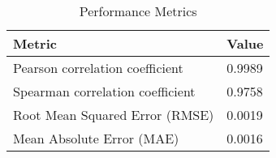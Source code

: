 \documentclass{article}
\begin{document}
\begin{table}[h!]
\centering
\begin{tabular}{ll}
\toprule
Metric & Value \\
\midrule
Pearson correlation coefficient & 0.9989 \\
Spearman correlation coefficient & 0.9758 \\
Root Mean Squared Error (RMSE) & 0.0019 \\
Mean Absolute Error (MAE) & 0.0016 \\
\bottomrule
\end{tabular}
\caption{Performance Metrics}
\label{tab:metrics}
\end{table}
\end{document}
